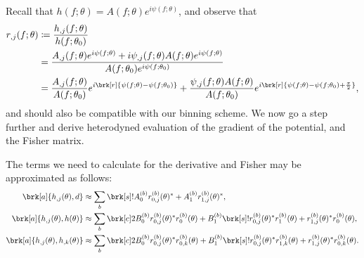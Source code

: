 Recall that $h(f; \theta) = A(f; \theta) e^{i \psi(f;\theta)}$, and observe that
\begin{align*}
r_{,j}(f;\theta) &\defn \frac{h_{,j}(f;\theta)}{h(f;\theta_0)} \\
&= \frac{A_{,j}(f;\theta) e^{i \psi(f;\theta)} + i \psi_{,j}(f;\theta) A(f;\theta) e^{i \psi(f;\theta)}}{A(f;\theta_0) e^{i \psi(f;\theta_0)}} \\
&= \frac{A_{,j}(f;\theta)}{A(f;\theta_0)} e^{i \brk[r]{\psi(f;\theta) - \psi(f;\theta_0)}} + \frac{\psi_{,j}(f;\theta)A(f;\theta)}{A(f;\theta_0)}e^{i \brk[r]{\psi(f;\theta) - \psi(f;\theta_0) + \frac{\pi}{2}}}, \\
\end{align*}
and should also be compatible with our binning scheme.
We now go a step further and derive heterodyned evaluation of the gradient of the potential, and the Fisher matrix.
\begin{proposition}[]\label{}
The terms we need to calculate for the derivative and Fisher may be approximated as follows:
\begin{align*}
\brk[a]{h_{,j}(\theta),d} &\approx \sum_b \brk[s]!{A_0^{(b)} r_{0,j}^{(b)} (\theta)^* + A_1^{(b)} r_{1,j}^{(b)}(\theta)^*}, \\
\brk[a]{h_{,j}(\theta), h(\theta)} &\approx \sum_b \brk[c]2{B_0^{(b)} r_{0,j}^{(b)}(\theta)^* r_0^{(b)}(\theta) + B_1^{(b)} \brk[s]!{r_{0,j}^{(b)}(\theta)^* r_1^{(b)}(\theta) + r_{1,j}^{(b)}(\theta)^* r_0^{(b)}(\theta)}}, \\
\brk[a]{h_{,j}(\theta), h_{,k}(\theta)} &\approx \sum_b \brk[c]2{B_0^{(b)} r_{0,j}^{(b)}(\theta)^* r_{0,k}^{(b)}(\theta) + B_1^{(b)} \brk[s]!{r_{0,j}^{(b)}(\theta)^* r_{1,k}^{(b)}(\theta) + r_{1,j}^{(b)}(\theta)^* r_{0,k}^{(b)}(\theta)}}.
\end{align*}
\end{proposition}
